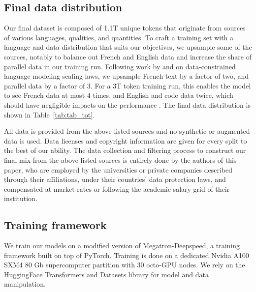 

\subsection{Final data distribution}
\label{sec:final_data}
Our final dataset is composed of 1.1T unique tokens that originate from sources of various languages, qualities, and quantities. To craft a training set with a language and data distribution that suits our objectives, we upsample some of the sources, notably to balance out French and English data and increase the share of parallel data in our training run. Following work by  and  on data-constrained language modeling scaling laws, we upsample French text by a factor of two, and parallel data by a factor of 3. For a 3T token training run, this enables the model to see French data at most 4 times, and English and code data twice, which should have negligible impacts on the performance . The final data distribution is shown in Table~\ref{tab:tab_tot}.

All data is provided from the above-listed sources and no synthetic or augmented data is used. Data licenses and copyright information are given for every split to the best of our ability. The data collection and filtering process to construct our final mix from the above-listed sources is entirely done by the authors of this paper, who are employed by the universities or private companies described through their affiliations, under their countries' data protection laws, and compensated at market rates or following the academic salary grid of their institution.



\subsection{Training framework}

We train our models on a modified version of Megatron-Deepspeed, a training framework built on top of PyTorch. Training is done on a dedicated Nvidia A100 SXM4 80 Gb supercomputer partition 
with 30 octo-GPU nodes. %
We rely on the HuggingFace Transformers and Datasets library for model and data manipulation.

